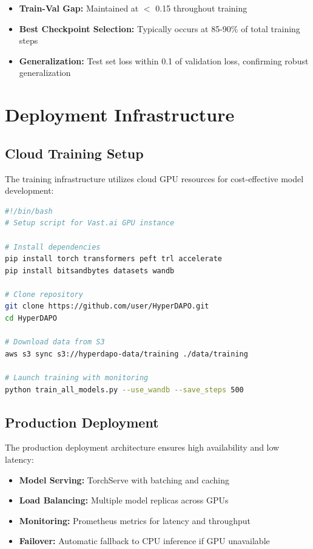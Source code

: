 \documentclass{report}
\begin{document}
\begin{itemize}
    \item \textbf{Train-Val Gap:} Maintained at $<$ 0.15 throughout training
    \item \textbf{Best Checkpoint Selection:} Typically occurs at 85-90\% of total training steps
    \item \textbf{Generalization:} Test set loss within 0.1 of validation loss, confirming robust generalization
\end{itemize}

\section{Deployment Infrastructure}

\subsection{Cloud Training Setup}

The training infrastructure utilizes cloud GPU resources for cost-effective model development:

\begin{lstlisting}[language=Bash, caption=Cloud environment setup]
#!/bin/bash
# Setup script for Vast.ai GPU instance

# Install dependencies
pip install torch transformers peft trl accelerate
pip install bitsandbytes datasets wandb

# Clone repository
git clone https://github.com/user/HyperDAPO.git
cd HyperDAPO

# Download data from S3
aws s3 sync s3://hyperdapo-data/training ./data/training

# Launch training with monitoring
python train_all_models.py --use_wandb --save_steps 500
\end{lstlisting}

\subsection{Production Deployment}

The production deployment architecture ensures high availability and low latency:

\begin{itemize}
    \item \textbf{Model Serving:} TorchServe with batching and caching
    \item \textbf{Load Balancing:} Multiple model replicas across GPUs
    \item \textbf{Monitoring:} Prometheus metrics for latency and throughput
    \item \textbf{Failover:} Automatic fallback to CPU inference if GPU unavailable
\end{itemize}
\end{document}
